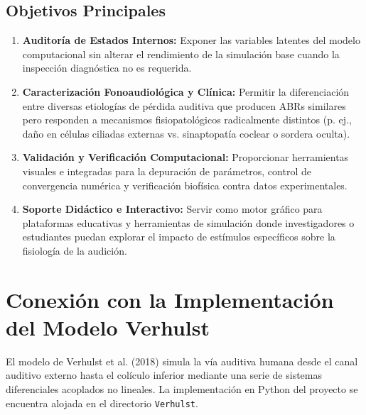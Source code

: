 \documentclass[12pt,a4paper]{article}
\begin{document}
\subsection{Objetivos Principales}
\begin{enumerate}
    \item \textbf{Auditoría de Estados Internos:} Exponer las variables latentes del modelo computacional sin alterar el rendimiento de la simulación base cuando la inspección diagnóstica no es requerida.
    \item \textbf{Caracterización Fonoaudiológica y Clínica:} Permitir la diferenciación entre diversas etiologías de pérdida auditiva que producen ABRs similares pero responden a mecanismos fisiopatológicos radicalmente distintos (p. ej., daño en células ciliadas externas vs. sinaptopatía coclear o sordera oculta).
    \item \textbf{Validación y Verificación Computacional:} Proporcionar herramientas visuales e integradas para la depuración de parámetros, control de convergencia numérica y verificación biofísica contra datos experimentales.
    \item \textbf{Soporte Didáctico e Interactivo:} Servir como motor gráfico para plataformas educativas y herramientas de simulación donde investigadores o estudiantes puedan explorar el impacto de estímulos específicos sobre la fisiología de la audición.
\end{enumerate}

\section{Conexión con la Implementación del Modelo Verhulst}

El modelo de Verhulst et al. (2018) simula la vía auditiva humana desde el canal auditivo externo hasta el colículo inferior mediante una serie de sistemas diferenciales acoplados no lineales. La implementación en Python del proyecto se encuentra alojada en el directorio {\texttt{Verhulst}}.
\end{document}
